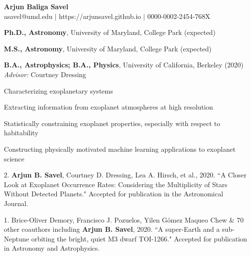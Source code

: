 \documentclass[12pt,letterpaper]{article}
\begin{document}
\thispagestyle{empty}\sloppy\sloppypar\raggedbottom
\centering
\textbf{\Large Arjun Baliga Savel} \hfill \\
\textsf{\small asavel@umd.edu $|$ https://arjunsavel.github.io} $|$ 0000-0002-2454-768X\\
\raggedright

\begin{list}{}{\cvlist}
\item
\textbf{Ph.D., Astronomy}, University of Maryland, College Park (expected)
\item
\textbf{M.S., Astronomy}, University of Maryland, College Park (expected)
\item
\textbf{B.A., Astrophysics; B.A., Physics}, University of California, Berkeley (2020) \\\textit{Advisor:} Courtney Dressing
\end{list}

\begin{list}{}{\cvlist}

\item Characterizing exoplanetary systems
\item Extracting information from exoplanet atmospheres at high resolution
\item Statistically constraining exoplanet properties, especially with respect to habitability
\item Constructing physically motivated machine learning applications to exoplanet science

\end{list}

\begin{list}{}{\cvlist}

\item 2. \textbf{Arjun B. Savel}, Courtney D. Dressing, Lea A. Hirsch, et al., 2020. ``A Closer Look at Exoplanet Occurrence Rates: Considering the Multiplicity of Stars Without Detected Planets." Accepted for publication in the Astronomical Journal.

\item 1. Brice-Oliver Demory, Francisco J. Pozuelos, Yilen Gómez Maqueo Chew \& 70 other coauthors including \textbf{Arjun B. Savel}, 2020. ``A super-Earth and a sub-Neptune orbiting the bright, quiet M3 dwarf TOI-1266." Accepted for publication in Astronomy and Astrophysics.
\end{list}
\end{document}
